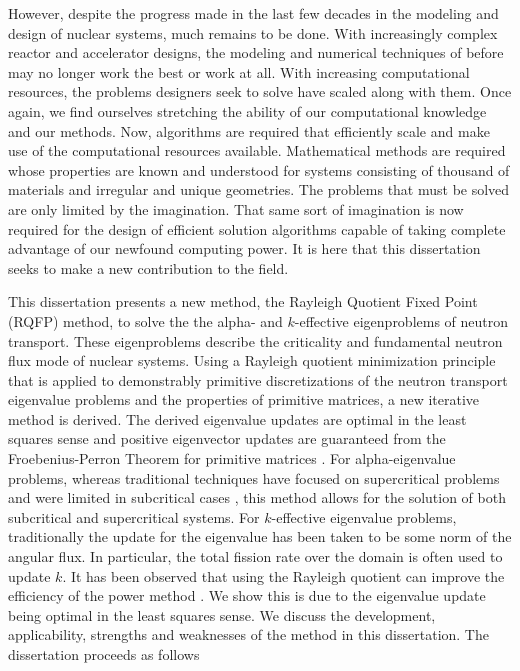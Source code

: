 However, despite the progress made in the last few decades in the modeling and design of nuclear systems, much remains to be done. With increasingly complex reactor and accelerator designs, the modeling and numerical techniques of before may no longer work the best or work at all. With increasing computational resources, the problems designers seek to solve have scaled along with them. Once again, we find ourselves stretching the ability of our computational knowledge and our methods. Now, algorithms are required that efficiently scale and make use of the computational resources available. Mathematical methods are required whose properties are known and understood for systems consisting of thousand of materials and irregular and unique geometries. The problems that must be solved are only limited by the imagination. That same sort of imagination is now required for the design of efficient solution algorithms capable of taking complete advantage of our newfound computing power. It is here that this dissertation seeks to make a new contribution to the field. 

This dissertation presents a new method, the Rayleigh Quotient Fixed Point (RQFP) method, to solve the the alpha- and $k$-effective eigenproblems of neutron transport. These eigenproblems describe the criticality and fundamental neutron flux mode of nuclear systems. Using a Rayleigh quotient minimization principle that is applied to demonstrably primitive discretizations of the neutron transport eigenvalue problems and the properties of primitive matrices, a new iterative method is derived. The derived eigenvalue updates are optimal in the least squares sense and positive eigenvector updates are guaranteed from the Froebenius-Perron Theorem for primitive matrices \cite{birkhoff_reactor_1958}. For alpha-eigenvalue problems, whereas traditional techniques have focused on supercritical problems and were limited in subcritical cases \cite{hill_efficient_1983}, this method allows for the solution of both subcritical and supercritical systems. For $k$-effective eigenvalue problems, traditionally the update for the eigenvalue has been taken to be some norm of the angular flux. In particular, the total fission rate over the domain is often used to update $k$. It has been observed that using the Rayleigh quotient can improve the efficiency of the power method \cite{warsa2004krylov}. We show this is due to the eigenvalue update being optimal in the least squares sense. 
We discuss the development, applicability, strengths and weaknesses of the method in this dissertation. The dissertation proceeds as follows

